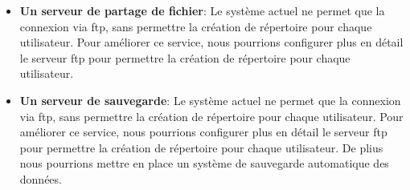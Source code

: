\documentclass[a4paper,12pt,openany]{report}
\begin{document}
            \begin{itemize}
                \item \textbf{Un serveur de partage de fichier}: Le système actuel ne permet que la connexion via ftp, sans permettre la création de répertoire pour chaque utilisateur. Pour améliorer ce service, nous pourrions configurer plus en détail le serveur ftp pour permettre la création de répertoire pour chaque utilisateur.
                \item \textbf{Un serveur de sauvegarde}: Le système actuel ne permet que la connexion via ftp, sans permettre la création de répertoire pour chaque utilisateur. Pour améliorer ce service, nous pourrions configurer plus en détail le serveur ftp pour permettre la création de répertoire pour chaque utilisateur. De plius nous pourrions mettre en place un système de sauvegarde automatique des données.
            \end{itemize} 
\end{document}
